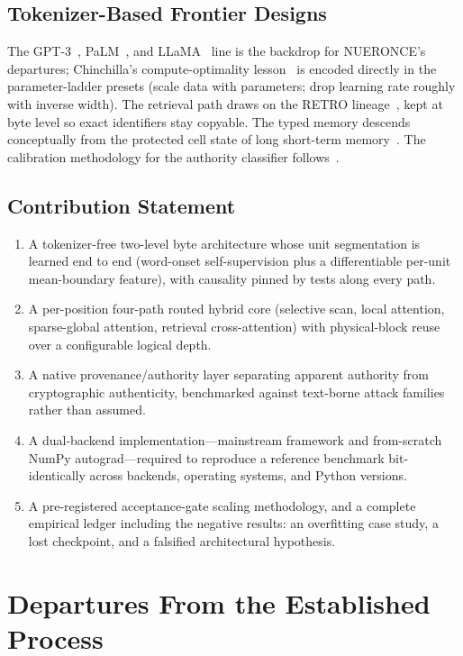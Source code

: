 \documentclass[journal]{IEEEtran}
\begin{document}
\subsection{Tokenizer-Based Frontier Designs}
The GPT-3~\cite{Brown2020}, PaLM~\cite{Chowdhery2022}, and LLaMA~\cite{Touvron2023} line is the backdrop for NUERONCE's departures; Chinchilla's compute-optimality lesson~\cite{Hoffmann2022} is encoded directly in the parameter-ladder presets (scale data with parameters; drop learning rate roughly with inverse width). The retrieval path draws on the RETRO lineage~\cite{Borgeaud2022}, kept at byte level so exact identifiers stay copyable. The typed memory descends conceptually from the protected cell state of long short-term memory~\cite{Hochreiter1997}. The calibration methodology for the authority classifier follows~\cite{Guo2017}.

\subsection{Contribution Statement}
\begin{enumerate}
\item A tokenizer-free two-level byte architecture whose unit segmentation is learned end to end (word-onset self-supervision plus a differentiable per-unit mean-boundary feature), with causality pinned by tests along every path.
\item A per-position four-path routed hybrid core (selective scan, local attention, sparse-global attention, retrieval cross-attention) with physical-block reuse over a configurable logical depth.
\item A native provenance/authority layer separating apparent authority from cryptographic authenticity, benchmarked against text-borne attack families rather than assumed.
\item A dual-backend implementation---mainstream framework and from-scratch NumPy autograd---required to reproduce a reference benchmark bit-identically across backends, operating systems, and Python versions.
\item A pre-registered acceptance-gate scaling methodology, and a complete empirical ledger including the negative results: an overfitting case study, a lost checkpoint, and a falsified architectural hypothesis.
\end{enumerate}

\section{Departures From the Established Process}
\end{document}
